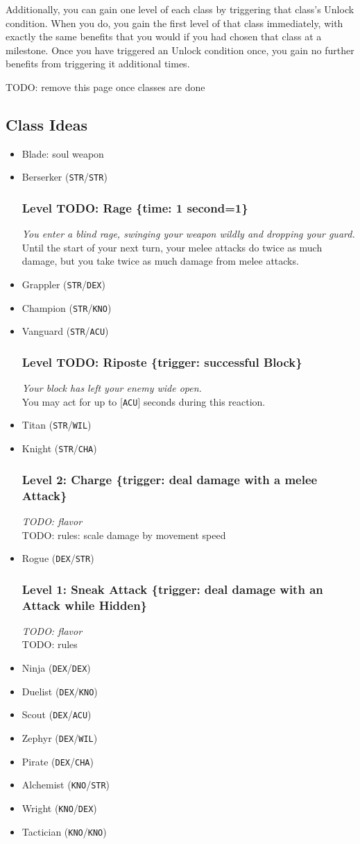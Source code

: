 \documentclass[12pt]{article}
\newcommand{\STR}{\texttt{STR}}
\newcommand{\DEX}{\texttt{DEX}}
\newcommand{\KNO}{\texttt{KNO}}
\newcommand{\ACU}{\texttt{ACU}}
\newcommand{\WIL}{\texttt{WIL}}
\newcommand{\CHA}{\texttt{CHA}}
\newcommand{\TIME}[1]{\{time: #1 second\if1=#1{}\else{s}\fi\}}
\newcommand{\TRIG}[1]{\{trigger: #1\}}
\newcommand{\Skill}[5]{\subsubsection{Level #1: #2 #3}\textit{#4}\\[1mm]#5}
\begin{document}
Additionally, you can gain one level of each class by triggering that class's Unlock condition. When you do, you gain the first level of that class immediately, with exactly the same benefits that you would if you had chosen that class at a milestone. Once you have triggered an Unlock condition once, you gain no further benefits from triggering it additional times.

\pagebreak
TODO: remove this page once classes are done

\subsection{Class Ideas}
\begin{itemize}
\item Blade: soul weapon
\item Berserker (\STR/\STR)

\Skill{TODO}{Rage}{\TIME{1}}
{You enter a blind rage, swinging your weapon wildly and dropping your guard.}
{Until the start of your next turn, your melee attacks do twice as much damage, but you take twice as much damage from melee attacks.}

\item Grappler (\STR/\DEX)
\item Champion (\STR/\KNO)
\item Vanguard (\STR/\ACU)

\Skill{TODO}{Riposte}{\TRIG{successful Block}}
{Your block has left your enemy wide open.}
{You may act for up to [\ACU] seconds during this reaction.}

\item Titan (\STR/\WIL)
\item Knight (\STR/\CHA)

\Skill{2}{Charge}{\TRIG{deal damage with a melee Attack}}
{TODO: flavor}
{TODO: rules: scale damage by movement speed}

\item Rogue (\DEX/\STR)

\Skill{1}{Sneak Attack}{\TRIG{deal damage with an Attack while Hidden}}
{TODO: flavor}
{TODO: rules}

\item Ninja (\DEX/\DEX)
\item Duelist (\DEX/\KNO)
\item Scout (\DEX/\ACU)
\item Zephyr (\DEX/\WIL)
\item Pirate (\DEX/\CHA)
\item Alchemist (\KNO/\STR)
\item Wright (\KNO/\DEX)
\item Tactician (\KNO/\KNO)


\end{itemize}
\end{document}
